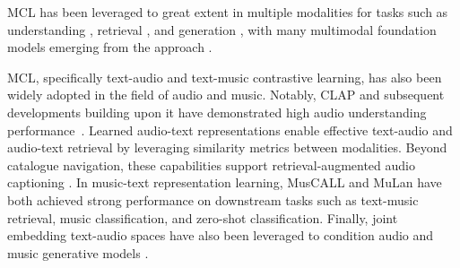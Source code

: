 \documentclass{article}
\newcommand{\alain}[1]{\textcolor{magenta}{#1}}
\newcommand{\comm}[1]{\textcolor{red}{TODO #1}}
\begin{document}
MCL has been leveraged to great extent in multiple modalities for tasks such as understanding \cite{clip}, retrieval \cite{manco2022contrastive}, and generation \cite{ramesh2022hierarchical}, with many multimodal foundation models emerging from the approach \cite{alayrac2022flamingo,AudioFlamingo}.

MCL, specifically text-audio and text-music contrastive learning, has also been widely adopted in the field of audio and music. Notably, CLAP \cite{elizalde2023clap} and subsequent developments building upon it have demonstrated high audio understanding performance~\cite{yuan2024t,wu2024collap,zhu2024cacophony,ghosh2025reclap}.
Learned audio-text representations enable effective text-audio and audio-text retrieval by leveraging similarity metrics between modalities. Beyond catalogue navigation, these capabilities support retrieval-augmented audio captioning \cite{li2025drcap, ghosh2024recap}.
In music-text representation learning, MusCALL \cite{manco2022contrastive} and MuLan \cite{mulan} have both achieved strong performance on downstream tasks such as text-music retrieval, music classification, and zero-shot classification.
Finally, joint embedding text-audio spaces have also been leveraged to condition audio and music generative models \cite{evans2024fast,evans2024long,diffariff,liu2023audioldm,agostinelli2023musiclm}.



\end{document}
